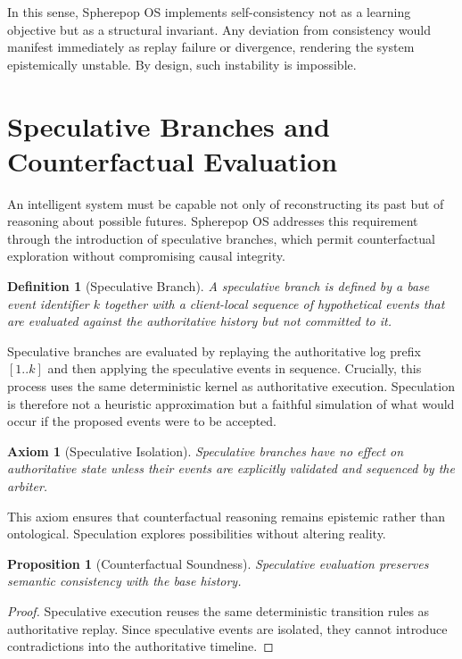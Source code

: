 \documentclass[11pt]{article}
\newtheorem{definition}{Definition}[section]
\newtheorem{axiom}{Axiom}[section]
\newtheorem{proposition}{Proposition}[section]
\begin{document}
In this sense, Spherepop OS implements self-consistency not as a learning
objective but as a structural invariant. Any deviation from consistency
would manifest immediately as replay failure or divergence, rendering the
system epistemically unstable. By design, such instability is impossible.

\section{Speculative Branches and Counterfactual Evaluation}

An intelligent system must be capable not only of reconstructing its past
but of reasoning about possible futures. Spherepop OS addresses this
requirement through the introduction of speculative branches, which permit
counterfactual exploration without compromising causal integrity.

\begin{definition}[Speculative Branch]
A speculative branch is defined by a base event identifier $k$ together with
a client-local sequence of hypothetical events that are evaluated against
the authoritative history but not committed to it.
\end{definition}

Speculative branches are evaluated by replaying the authoritative log prefix
$[1..k]$ and then applying the speculative events in sequence. Crucially,
this process uses the same deterministic kernel as authoritative execution.
Speculation is therefore not a heuristic approximation but a faithful
simulation of what would occur if the proposed events were to be accepted.

\begin{axiom}[Speculative Isolation]
Speculative branches have no effect on authoritative state unless their
events are explicitly validated and sequenced by the arbiter.
\end{axiom}

This axiom ensures that counterfactual reasoning remains epistemic rather
than ontological. Speculation explores possibilities without altering
reality.

\begin{proposition}[Counterfactual Soundness]
Speculative evaluation preserves semantic consistency with the base history.
\end{proposition}

\begin{proof}
Speculative execution reuses the same deterministic transition rules as
authoritative replay. Since speculative events are isolated, they cannot
introduce contradictions into the authoritative timeline.
\end{proof}
\end{document}
